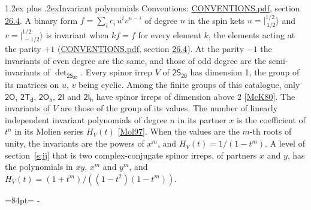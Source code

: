 \documentclass[10pt,a4paper]{article}
\makeatletter
\renewcommand\section{\@startsection{section}{1}{\z@}{-3ex plus -1ex minus -.2ex}%
  {1.2ex plus .2ex}{\normalfont\large\sffamily\bfseries\color{parttitle}}}
\newcommand{\needspace}[1]{\par\penalty-100\begingroup\dimen0=#1\relax\dimen2=\pagegoal
  \advance\dimen2-\pagetotal\ifdim\dimen0>\dimen2\relax\ifdim\dimen2>0pt\vfil\break\fi\fi
  \endgroup}
\numberwithin{equation}{section}
\newcommand{\grp}[1]{\mathsf{#1}}
\newcommand{\jm}[2]{\bigl\lvert{}^{#1}_{\,#2}\bigr\rangle}
\makeatother
\begin{document}
\section{Invariant polynomials}\label{s:invariants}
Conventions: \href{../../CONVENTIONS.pdf}{CONVENTIONS.pdf}, section \href{../../CONVENTIONS.pdf\#conv.26.4}{26.4}.
\leavevmode\label{n:local.binary.form}A binary form $f = \sum_i c_i\, u^i v^{n-i}$ of degree $n$ in the spin kets $u = \jm{1/2}{1/2}$ and $v = \jm{1/2}{-1/2}$ is invariant when $k f = f$ for every element $k$, the elements acting at the parity $+1$ (\href{../../CONVENTIONS.pdf}{CONVENTIONS.pdf}, section \href{../../CONVENTIONS.pdf\#conv.26.4}{26.4}). At the parity $-1$ the invariants of even degree are the same, and those of odd degree are the semi-invariants of $\det_{\grp{2S_{20}}}$.
\leavevmode\label{n:function.hilbert}Every spinor irrep $V$ of $\grp{2S_{20}}$ has dimension 1, the group of its matrices on $u$, $v$ being cyclic. Among the finite groups of this catalogue, only $\grp{2O}$, $\grp{2T_{d}}$, $\grp{2O_{h}}$, $\grp{2I}$ and $\grp{2I_{h}}$ have spinor irreps of dimension above 2 [\href{../../../REFERENCES.pdf\#ref.McK80}{McK80}]. The invariants of $V$ are those of the group of its values. \label{n:local.partner.x}The number of linearly independent invariant polynomials of degree $n$ in its partner $x$ is the coefficient of $t^n$ in its Molien series $H_V(t)$ [\href{../../../REFERENCES.pdf\#ref.Mol97}{Mol97}]. When the values are the $m$-th roots of unity, the invariants are the powers of $x^{m}$, and $H_V(t) = 1/(1 - t^{m})$. A level of section~\ref{s:jj} that is two complex-conjugate spinor irreps, of partners $x$ and $y$, has the polynomials in $xy$, $x^{m}$ and $y^{m}$, and $H_V(t) = (1 + t^{m})/((1 - t^{2})(1 - t^{m}))$.
\needspace{84pt}
\end{document}
